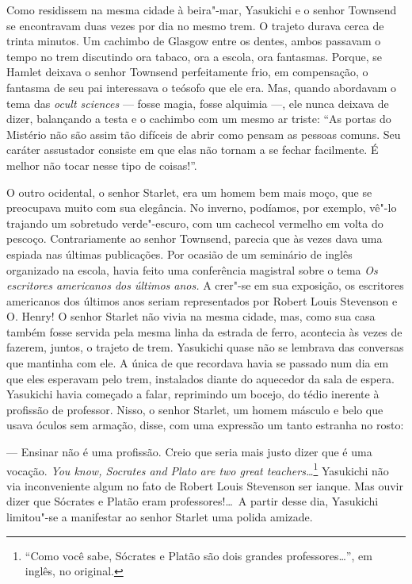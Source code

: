 Como residissem na mesma cidade à beira"-mar, Yasukichi e o senhor
Townsend se encontravam duas vezes por dia no mesmo trem. O trajeto
durava cerca de trinta minutos. Um cachimbo de Glasgow entre os dentes,
ambos passavam o tempo no trem discutindo ora tabaco, ora a escola, ora
fantasmas. Porque, se Hamlet deixava o senhor Townsend perfeitamente
frio, em compensação, o fantasma de seu pai interessava o teósofo que
ele era. Mas, quando abordavam o tema das \textit{ocult sciences} ---
fosse magia, fosse alquimia ---, ele nunca deixava de dizer, balançando a
testa e o cachimbo com um mesmo ar triste: ``As portas do Mistério não
são assim tão difíceis de abrir como pensam as pessoas comuns. Seu
caráter assustador consiste em que elas não tornam a se fechar
facilmente. É melhor não tocar nesse tipo de coisas!''.

O outro ocidental, o senhor Starlet, era um homem bem mais moço, que se
preocupava muito com sua elegância. No inverno, podíamos, por exemplo,
vê"-lo trajando um sobretudo verde"-escuro, com um cachecol vermelho em
volta do pescoço. Contrariamente ao senhor Townsend, parecia que às
vezes dava uma espiada nas últimas publicações. Por ocasião de um
seminário de inglês organizado na escola, havia feito uma conferência
magistral sobre o tema \textit{Os escritores americanos dos últimos anos.} 
A crer"-se em sua exposição, os escritores americanos dos
últimos anos seriam representados por Robert Louis Stevenson e O.
Henry! O senhor Starlet não vivia na mesma cidade, mas, como sua casa
também fosse servida pela mesma linha da estrada de ferro, acontecia às
vezes de fazerem, juntos, o trajeto de trem. Yasukichi quase não se
lembrava das conversas que mantinha com ele. A única de que recordava
havia se passado num dia em que eles esperavam pelo trem, instalados
diante do aquecedor da sala de espera. Yasukichi havia começado a
falar, reprimindo um bocejo, do tédio inerente à profissão de
professor. Nisso, o senhor Starlet, um homem másculo e belo que usava
óculos sem armação, disse, com uma expressão um tanto estranha no
rosto:

--- Ensinar não é uma profissão. Creio que seria mais justo dizer que é
uma vocação. \textit{You know, Socrates and Plato are two great
teachers\ldots{}}\footnote{ ``Como você sabe, Sócrates e Platão são dois
grandes professores\ldots{}'', em inglês, no original.} 
Yasukichi não via inconveniente algum no fato de Robert Louis Stevenson
ser ianque. Mas ouvir dizer que Sócrates e Platão eram professores!\ldots{}\
A partir desse dia, Yasukichi limitou"-se a manifestar ao senhor Starlet
uma polida amizade.

